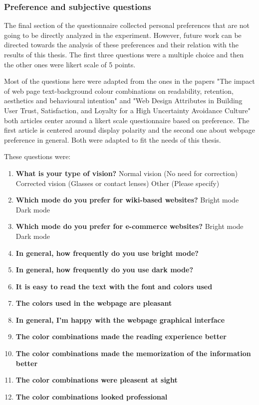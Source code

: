 \subsubsection{Preference and subjective questions}
The final section of the questionnaire collected personal preferences that are not going 
to be directly analyzed in the experiment. However, future work can be directed towards 
the analysis of these preferences and their relation with the results of this thesis. The 
first three questions were a multiple choice and then the other ones were likert scale of 5 points.


Most of the questions here were adapted from the ones in the papers "The impact of web page text-background 
colour combinations on readability, retention, aesthetics and behavioural intention"\cite{Hall2004} and 
"Web Design Attributes in Building User Trust, Satisfaction, and Loyalty for a High Uncertainty Avoidance Culture"
\cite{Faisal2016} both articles center around a likert scale questionnaire based on preference. The first article 
is centered around display polarity and the second one about webpage preference in general. Both were
adapted to fit the needs of this thesis.

These questions were:
\begin{enumerate}
    \item{ \textbf{What is your type of vision?}}
    \subitem Normal vision (No need for correction)
    \subitem Corrected vision (Glasses or contact lenses)
    \subitem Other (Please specify)
    \item{ \textbf{Which mode do you prefer for wiki-based websites?}}
    \subitem Bright mode
    \subitem Dark mode
    \item{ \textbf{Which mode do you prefer for e-commerce websites?}}
    \subitem Bright mode
    \subitem Dark mode
    \item{ \textbf{In general, how frequently do you use bright mode?}}
    \item { \textbf{In general, how frequently do you use dark mode?}}
    \item { \textbf{It is easy to read the text with the font and colors used}}
    \item {\textbf{The colors used in the webpage are pleasant}}
    \item {\textbf{In general, I'm happy with the webpage graphical interface}}
    \item {\textbf{The color combinations made the reading experience better}}
    \item {\textbf{The color combinations made the memorization of the information better}}
    \item {\textbf{The color combinations were pleasent at sight}}
    \item {\textbf{The color combinations looked professional}}
\end{enumerate}